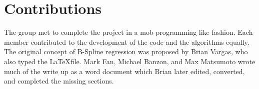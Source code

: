 \section{Contributions}

The group met to complete the project in a mob programming like fashion. Each
member contributed to the development of the code and the algorithms equally. The original
concept of B-Spline regression was proposed by Brian Vargas, who also typed the \LaTeX  file.
Mark Fan, Michael Banzon, and Max Matsumoto wrote much of the write up as a word
document which Brian later edited, converted, and completed the missing sections.
